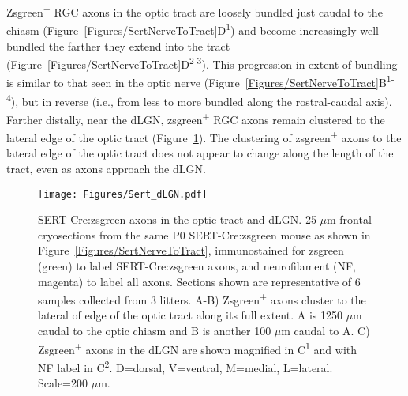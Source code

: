 Zsgreen\textsuperscript{+} RGC axons in the optic tract are loosely bundled just caudal to the chiasm (Figure~\ref{Figures/SertNerveToTract}D\textsuperscript{1}) and become increasingly well bundled the farther they extend into the tract (Figure~\ref{Figures/SertNerveToTract}D\textsuperscript{2-3}).
This progression in extent of bundling is similar to that seen in the optic nerve (Figure~\ref{Figures/SertNerveToTract}B\textsuperscript{1-4}), but in reverse (i.e., from less to more bundled along the rostral-caudal axis).
Farther distally, near the dLGN, zsgreen\textsuperscript{+} RGC axons remain clustered to the lateral edge of the optic tract (Figure~\ref{Figures/SertdLGN}).
The clustering of zsgreen\textsuperscript{+} axons to the lateral edge of the optic tract does not appear to change along the length of the tract, even as axons approach the dLGN.

\begin{figure}[hbtp]
    \begin{center}
        \texttt{[image: Figures/Sert\_dLGN.pdf]}
        \caption[SERT-Cre:zsgreen axons in the optic tract and dLGN.]
        {SERT-Cre:zsgreen axons in the optic tract and dLGN.
        25 $\mu$m frontal cryosections from the same P0 SERT-Cre:zsgreen mouse as shown in Figure~\ref{Figures/SertNerveToTract}, immunostained for zsgreen (green) to label SERT-Cre:zsgreen axons, and neurofilament (NF, magenta) to label all axons.
        Sections shown are representative of 6 samples collected from 3 litters. 
        A-B) Zsgreen\textsuperscript{+} axons cluster to the lateral of edge of the optic tract along its full extent.
        A is 1250 $\mu$m caudal to the optic chiasm and B is another 100 $\mu$m caudal to A.
        C) Zsgreen\textsuperscript{+} axons in the dLGN are shown magnified in C\textsuperscript{1} and with NF label in C\textsuperscript{2}.
        D=dorsal, V=ventral, M=medial, L=lateral.
		Scale=200 $\mu$m.}
        \label{Figures/SertdLGN}
    \end{center}
\end{figure}